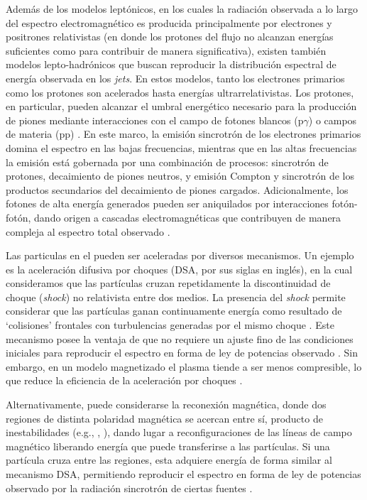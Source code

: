	Además de los modelos {leptónicos}, en los cuales la radiación observada a lo largo del espectro electromagnético es producida principalmente por electrones y positrones relativistas (en donde los protones del flujo no alcanzan energías suficientes como para contribuir de manera significativa), existen también modelos {lepto-hadrónicos} que buscan reproducir la distribución espectral de energía observada en los \textit{jets}.
	En estos modelos, tanto los electrones primarios como los protones son acelerados hasta energías ultrarrelativistas.
	Los protones, en particular, pueden alcanzar el umbral energético necesario para la producción de piones mediante interacciones con el campo de fotones blancos (p$\gamma$) \citep[e.g.][]{Mucke2000} o campos de materia (pp) \citep[e.g.][]{Kelner2006}.
	En este marco, la emisión sincrotrón de los electrones primarios domina el espectro en las bajas frecuencias, mientras que en las altas frecuencias la emisión está gobernada por una combinación de procesos: sincrotrón de protones, decaimiento de piones neutros, y emisión Compton y sincrotrón de los productos secundarios del decaimiento de piones cargados.
	Adicionalmente, los fotones de alta energía generados pueden ser aniquilados por interacciones fotón-fotón, dando origen a cascadas electromagnéticas que contribuyen de manera compleja al espectro total observado \citep{Bottcher2013}.

Las particulas en el \jet pueden ser aceleradas por diversos mecanismos. Un ejemplo es la aceleración difusiva por choques (DSA, por sus siglas en ingl\'es), en la cual consideramos que  las partículas cruzan repetidamente la discontinuidad de choque (\textit{shock}) no relativista entre dos medios. La presencia del \textit{shock} permite considerar que las partículas ganan continuamente energ\'ia como resultado de `colisiones' frontales con turbulencias generadas por el mismo choque \citep{Bell1978, Drury1983,Matthews2020}. 
Este mecanismo posee la ventaja de que no requiere un ajuste fino de las condiciones iniciales para reproducir el espectro en forma de ley de potencias observado \citep{Matthews2020}. Sin embargo, en un modelo magnetizado el plasma tiende a ser menos compresible, lo que reduce la eficiencia de la aceleración por choques \citep{Romero2018}.

	Alternativamente, puede considerarse la reconexión  magnética, donde dos regiones de distinta polaridad magn\'etica se acercan entre s\'i, producto de inestabilidades (e.g., \citealt{Begelman1998}, \citealt{Barniol2017}), dando lugar a reconfiguraciones de las líneas de campo magnético liberando energía que puede transferirse a las partículas.
	Si una partícula cruza entre las regiones, esta adquiere energía de forma similar al mecanismo DSA, permitiendo reproducir el espectro en forma de ley de potencias observado por la radiaci\'on sincrotr\'on de ciertas fuentes \citep{Matthews2020}. 



